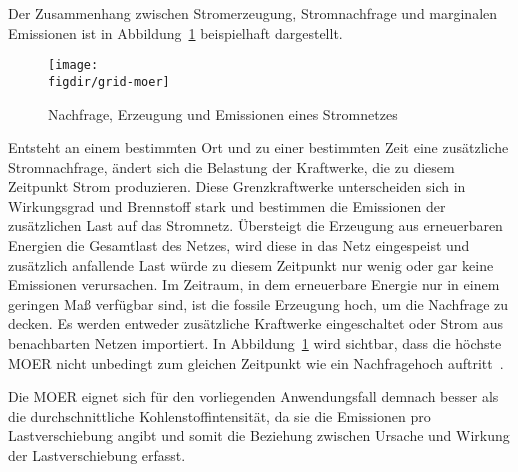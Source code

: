 Der Zusammenhang zwischen Stromerzeugung, Stromnachfrage und marginalen Emissionen ist in Abbildung~\ref{FIG:grid-moer} beispielhaft dargestellt.
\begin{figure}
 \caption[Nachfrage, Erzeugung und Emissionen eines Stromnetzes]{Nachfrage, Erzeugung und Emissionen eines Stromnetzes~\cite{DiStefano.2019}}
 {\texttt{[image: \\figdir/grid-moer]}}
 \label{FIG:grid-moer}
\end{figure}
Entsteht an einem bestimmten Ort und zu einer bestimmten Zeit eine zusätzliche Stromnachfrage, ändert sich die Belastung der Kraftwerke, die zu diesem Zeitpunkt Strom produzieren.
Diese Grenzkraftwerke unterscheiden sich in Wirkungsgrad und Brennstoff stark und bestimmen die Emissionen der zusätzlichen Last auf das Stromnetz.
Übersteigt die Erzeugung aus erneuerbaren Energien die Gesamtlast des Netzes, wird diese in das Netz eingespeist und zusätzlich anfallende Last würde zu diesem Zeitpunkt nur wenig oder gar keine Emissionen verursachen.
Im Zeitraum, in dem erneuerbare Energie nur in einem geringen Maß verfügbar sind, ist die fossile Erzeugung hoch, um die Nachfrage zu decken.
Es werden entweder zusätzliche Kraftwerke eingeschaltet oder Strom aus benachbarten Netzen importiert.
In Abbildung~\ref{FIG:grid-moer} wird sichtbar, dass die höchste \ac{MOER} nicht unbedingt zum gleichen Zeitpunkt wie ein Nachfragehoch auftritt~\cite{DiStefano.2019}.

Die \ac{MOER} eignet sich für den vorliegenden Anwendungsfall demnach besser als die durchschnittliche Kohlenstoffintensität, da sie die Emissionen pro Lastverschiebung angibt und somit die Beziehung zwischen Ursache und Wirkung der Lastverschiebung erfasst\cite{Wiesner.2021}.


